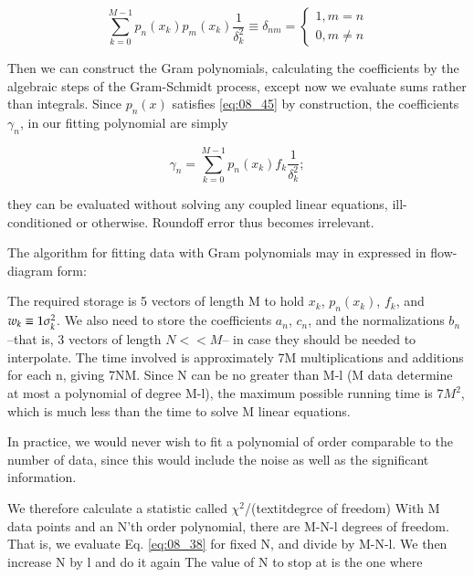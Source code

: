 \begin{equation}\label{eq:08_45}
\sum_{k=0}^{M-1}p_{n}(x_{k})p_{m}(x_{k})\frac{1}{\delta_{k}^{2}} \equiv \delta_{nm} =
    \begin{cases}
        1, m   = n \\
        0, m \ne n 
    \end{cases}
\end{equation}

Then we can construct the Gram polynomials, calculating the
coefficients by the algebraic steps of the Gram-Schmidt process, except now we evaluate sums rather than integrals. Since $p_{n}(x)$ satisfies \ref{eq:08_45} by construction, the coefficients $\gamma_{n}$, in our fitting polynomial are simply

\begin{equation}
\gamma_{n} = \sum_{k=0}^{M-1} p_{n}(x_{k})f_{k}\frac{1}{\delta_{k}^{2}} ;
\end{equation}

they can be evaluated without solving any coupled linear equations, ill-conditioned or otherwise. Roundoff error thus becomes irrelevant.

The algorithm for fitting data with Gram polynomials may in expressed in flow-diagram form:



The required storage is 5 vectors of length M to hold $x_{k}$, $p_{n}(x_{k})$, $f_{k}$, and $w_{k} \equiv 1\/\sigma_{k}^{2}$. We also need to store the coefficients $a_{n}$, $c_{n}$, and the normalizations $b_{n}$ --that is, 3 vectors of length $N<<M$-- in case they should be needed to interpolate. The time involved is approximately 7M multiplications and additions for each n, giving 7NM. Since N can be no greater than M-l (M data determine at most a polynomial of degree M-l), the maximum possible running time is $7M^{2}$, which is much less than the time to solve M linear equations.

In practice, we would never wish to fit a polynomial of order comparable to the number of data, since this would include the noise as well as the significant information.

We therefore calculate a statistic called $\chi^{2}$/(textit{degrce of freedom}) With M data points and an N'th order polynomial, there are M-N-l degrees of freedom. That is, we evaluate Eq. \ref{eq:08_38} for fixed N, and divide by M-N-l. We then increase N by l and do it again The value of N to stop at is the one where

